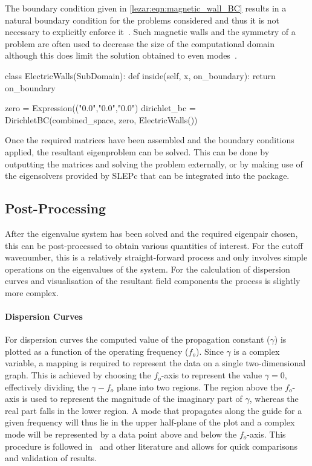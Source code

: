 The boundary condition given in \eqref{lezar:eqn:magnetic_wall_BC} results
in a natural boundary condition for the problems considered and thus
it is not necessary to explicitly enforce it~\cite{PelosiCoccioliSelleri1998}.  Such
magnetic walls and the symmetry of a problem are often used to
decrease the size of the computational domain although this does limit
the solution obtained to even modes~\cite{Jin2002}.

\begin{python}
class ElectricWalls(SubDomain):
    def inside(self, x, on_boundary):
        return on_boundary

zero = Expression(("0.0","0.0","0.0")
dirichlet_bc = DirichletBC(combined_space, zero, ElectricWalls())
\end{python}

Once the required matrices have been assembled and the boundary
conditions applied, the resultant eigenproblem can be solved. This can
be done by outputting the matrices and solving the problem externally,
or by making use of the eigensolvers provided by SLEPc that can be
integrated into the \fenics{} package.

\subsection{Post-Processing}

After the eigenvalue system has been solved and the required eigenpair
chosen, this can be post-processed to obtain various quantities of
interest. For the cutoff wavenumber, this is
a relatively straight-forward process and only involves simple
operations on the eigenvalues of the system. For the calculation of
dispersion curves and visualisation of the resultant field components
the process is slightly more complex.

\paragraph{Dispersion Curves}

For dispersion curves the computed value of the propagation constant
($\gamma$) is plotted as a function of the operating frequency
($f_o$).  Since $\gamma$ is a complex variable, a mapping is required
to represent the data on a single two-dimensional graph. This is
achieved by choosing the $f_o$-axis to represent the value $\gamma =
0$, effectively dividing the {$\gamma-f_o$} plane into two
regions. The region above the $f_o$-axis is used to represent the
magnitude of the imaginary part of $\gamma$, whereas the real part
falls in the lower region. A mode that propagates along the guide for
a given frequency will thus lie in the upper half-plane of the plot
and a complex mode will be represented by a data point above and below
the $f_o$-axis.  This procedure is followed in~\cite{PelosiCoccioliSelleri1998} and
other literature and allows for quick comparisons and validation of
results.


